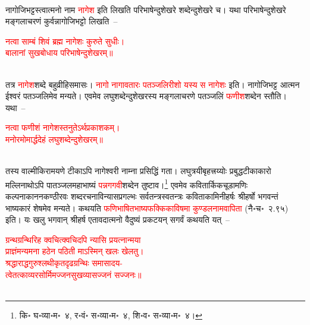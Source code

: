 \\
\begin{sloppypar}\justifying\noindent नागोजिभट्टस्त्वात्मनो नाम \textcolor{red}{नागेश} इति लिखति परिभाषेन्दुशेखरे शब्देन्दुशेखरे च। यथा परिभाषेन्दुशेखरे मङ्गलाचरणं कुर्वन्नागोजिभट्टो लिखति~–\end{sloppypar}
\centering\textcolor{red}{नत्वा साम्बं शिवं ब्रह्म नागेशः कुरुते सुधीः।\nopagebreak\\
बालानां सुखबोधाय परिभाषेन्दुशेखरम्॥}\nopagebreak\\
\\
\begin{sloppypar}\justifying\noindent तत्र \textcolor{red}{नागेश}\-शब्दे बहुव्रीहि\-समासः। \textcolor{red}{नागो नागावतारः पतञ्जलिरीशो यस्य स नागेशः} इति। नागोजिभट्ट आत्मन ईश्वरं पतञ्जलिमेव मन्यते। एवमेव लघु\-शब्देन्दु\-शेखरस्य मङ्गलाचरणे पतञ्जलिं \textcolor{red}{फणीश}\-शब्देन स्तौति। यथा~–\end{sloppypar}
\centering\textcolor{red}{नत्वा फणीशं नागेशस्तनुतेऽर्थप्रकाशकम्। \nopagebreak\\
मनोरमोमार्द्धदेहं लघुशब्देन्दुशेखरम्॥}\nopagebreak\\
\\
\begin{sloppypar}\justifying\noindent तस्य वाल्मीकि\-रामयणे टीकाऽपि नागेश्वरी नाम्ना प्रसिद्धिं गता। लघुत्रयी\-बृहत्त्रय्योः प्रबुद्ध\-टीकाकारो मल्लिनाथोऽपि पातञ्जल\-महाभाष्यं \textcolor{red}{पन्नगगवी}\-शब्देन तुष्टाव।\footnote{कि॰ घ॰व्या॰म॰~४, र॰वं॰ स॰व्या॰म॰~४, शि॰व॰ स॰व्या॰म॰~४।} एवमेव कवि\-तार्किक\-चूडामणिः कल्पना\-कानन\-कण्ठीरवः शब्द\-रचना\-विन्यास\-प्रगल्भः सर्व\-तन्त्र\-स्वतन्त्रः कविता\-कामिनी\-हर्षः श्रीहर्षो भगवन्तं भाष्यकारं शेषमेव मन्यते। कथयति \textcolor{red}{फणि\-भाषित\-भाष्य\-फक्किका\-विषमा कुण्डल\-नामवापिता} (नै॰च॰~२.९५) इति। यः खलु भगवान् श्रीहर्ष एतावदात्मनो वैदुष्यं प्रकटयन् सगर्वं कथयति यत्~–\end{sloppypar}
\centering\textcolor{red}{ग्रन्थग्रन्थिरिह क्वचित्क्वचिदपि न्यासि प्रयत्नान्मया \nopagebreak\\
प्राज्ञंमन्यमना हठेन पठिती माऽस्मिन् खलः खेलतु।\\
श्रद्धाराद्धगुरुश्लथीकृतदृढग्रन्थिः समासादय-\nopagebreak\\
त्वेतत्काव्यरसोर्मिमज्जनसुखव्यासज्जनं सज्जनः॥}\nopagebreak\\
\\
